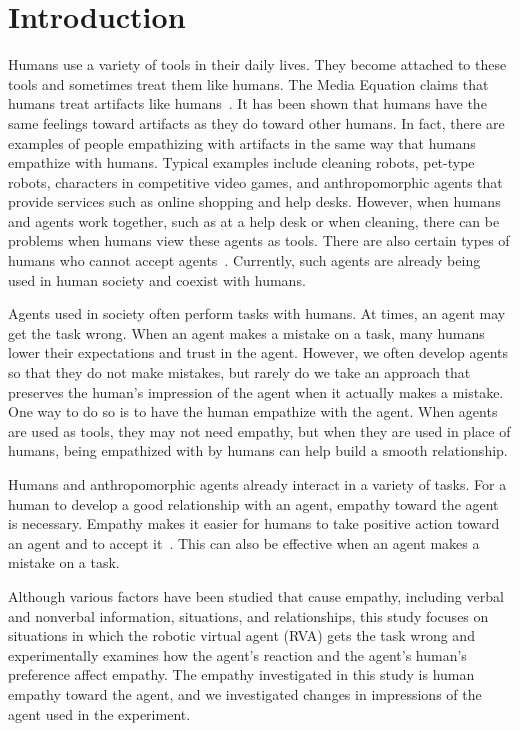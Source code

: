 \documentclass[runningheads]{llncs}
\begin{document}
\section{Introduction}
Humans use a variety of tools in their daily lives. They become attached to these tools and sometimes treat them like humans. 
The Media Equation claims that humans treat artifacts like humans~\cite{Reeves96}. 
It has been shown that humans have the same feelings toward artifacts as they do toward other humans. 
In fact, there are examples of people empathizing with artifacts in the same way that humans empathize with humans. 
Typical examples include cleaning robots, pet-type robots, characters in competitive video games, and anthropomorphic agents that provide services such as online shopping and help desks. 
However, when humans and agents work together, such as at a help desk or when cleaning, there can be problems when humans view these agents as tools. 
There are also certain types of humans who cannot accept agents~\cite{Nomura06,Nomura08,Nomura16}. 
Currently, such agents are already being used in human society and coexist with humans.

Agents used in society often perform tasks with humans. 
At times, an agent may get the task wrong. When an agent makes a mistake on a task, many humans lower their expectations and trust in the agent. 
However, we often develop agents so that they do not make mistakes, but rarely do we take an approach that preserves the human's impression of the agent when it actually makes a mistake. 
One way to do so is to have the human empathize with the agent. 
When agents are used as tools, they may not need empathy, but when they are used in place of humans, being empathized with by humans can help build a smooth relationship.

Humans and anthropomorphic agents already interact in a variety of tasks. 
For a human to develop a good relationship with an agent, empathy toward the agent is necessary. 
Empathy makes it easier for humans to take positive action toward an agent and to accept it~\cite{Tsumura22,Tsumura23-1,Tsumura23-2}. 
This can also be effective when an agent makes a mistake on a task. 

Although various factors have been studied that cause empathy, including verbal and nonverbal information, situations, and relationships, this study focuses on situations in which the robotic virtual agent (RVA) gets the task wrong and experimentally examines how the agent's reaction and the agent's human's preference affect empathy.
The empathy investigated in this study is human empathy toward the agent, and we investigated changes in impressions of the agent used in the experiment.
\end{document}
